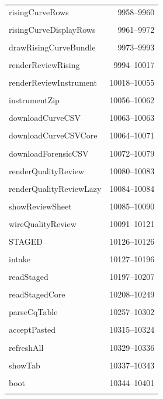 {\begin{longtable}{@{}p{11cm}r@{}}
risingCurveRows & 9958--9960 \\\\\hline
risingCurveDisplayRows & 9961--9972 \\\\\hline
drawRisingCurveBundle & 9973--9993 \\\\\hline
renderReviewRising & 9994--10017 \\\\\hline
renderReviewInstrument & 10018--10055 \\\\\hline
instrumentZip & 10056--10062 \\\\\hline
downloadCurveCSV & 10063--10063 \\\\\hline
downloadCurveCSVCore & 10064--10071 \\\\\hline
downloadForensicCSV & 10072--10079 \\\\\hline
renderQualityReview & 10080--10083 \\\\\hline
renderQualityReviewLazy & 10084--10084 \\\\\hline
showReviewSheet & 10085--10090 \\\\\hline
wireQualityReview & 10091--10121 \\\\\hline
STAGED & 10126--10126 \\\\\hline
intake & 10127--10196 \\\\\hline
readStaged & 10197--10207 \\\\\hline
readStagedCore & 10208--10249 \\\\\hline
parseCqTable & 10257--10302 \\\\\hline
acceptPasted & 10315--10324 \\\\\hline
refreshAll & 10329--10336 \\\\\hline
showTab & 10337--10343 \\\\\hline
boot & 10344--10401 \\\\\hline

\end{longtable}}
